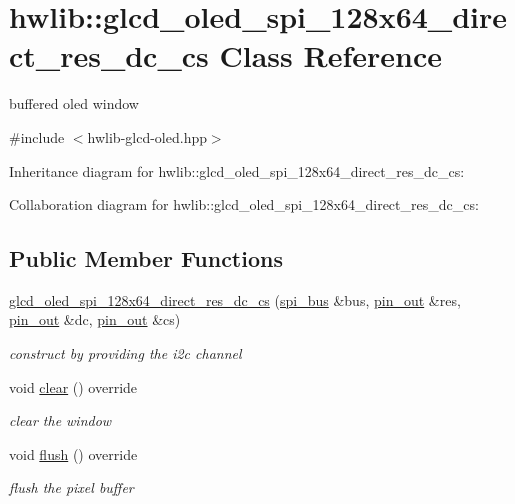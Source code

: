 \hypertarget{classhwlib_1_1glcd__oled__spi__128x64__direct__res__dc__cs}{}\section{hwlib\+:\+:glcd\+\_\+oled\+\_\+spi\+\_\+128x64\+\_\+direct\+\_\+res\+\_\+dc\+\_\+cs Class Reference}
\label{classhwlib_1_1glcd__oled__spi__128x64__direct__res__dc__cs}


buffered oled window  




{\ttfamily \#include $<$hwlib-\/glcd-\/oled.\+hpp$>$}



Inheritance diagram for hwlib\+:\+:glcd\+\_\+oled\+\_\+spi\+\_\+128x64\+\_\+direct\+\_\+res\+\_\+dc\+\_\+cs\+:


Collaboration diagram for hwlib\+:\+:glcd\+\_\+oled\+\_\+spi\+\_\+128x64\+\_\+direct\+\_\+res\+\_\+dc\+\_\+cs\+:
\subsection*{Public Member Functions}
\begin{DoxyCompactItemize}
\item 
\mbox{\label{classhwlib_1_1glcd__oled__spi__128x64__direct__res__dc__cs_a81a6918877f063040e2dd25b9af558e7}} 
\hyperlink{classhwlib_1_1glcd__oled__spi__128x64__direct__res__dc__cs_a81a6918877f063040e2dd25b9af558e7}{glcd\+\_\+oled\+\_\+spi\+\_\+128x64\+\_\+direct\+\_\+res\+\_\+dc\+\_\+cs} (\hyperlink{classhwlib_1_1spi__bus}{spi\+\_\+bus} \&bus, \hyperlink{classhwlib_1_1pin__out}{pin\+\_\+out} \&res, \hyperlink{classhwlib_1_1pin__out}{pin\+\_\+out} \&dc, \hyperlink{classhwlib_1_1pin__out}{pin\+\_\+out} \&cs)
\begin{DoxyCompactList}\small\item\em construct by providing the i2c channel \end{DoxyCompactList}\item 
void \hyperlink{classhwlib_1_1glcd__oled__spi__128x64__direct__res__dc__cs_afebf8245a39c31859ef21eae3d9deb69}{clear} () override
\begin{DoxyCompactList}\small\item\em clear the window \end{DoxyCompactList}\item 
void \hyperlink{classhwlib_1_1glcd__oled__spi__128x64__direct__res__dc__cs_ada856fccd0e72f8e95172e1aa901024c}{flush} () override
\begin{DoxyCompactList}\small\item\em flush the pixel buffer \end{DoxyCompactList}\end{DoxyCompactItemize}
